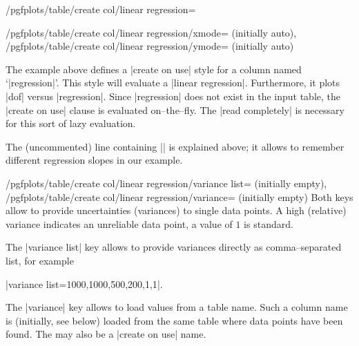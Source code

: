 \begin{stylekey}{/pgfplots/table/create col/linear regression=}
\begin{keylist}{%
		/pgfplots/table/create col/linear regression/xmode= (initially auto),
		/pgfplots/table/create col/linear regression/ymode= (initially auto)}
\begin{codeexample}[]
\end{codeexample}
	The example above defines a |create on use| style for a column named `|regression|'. This style will evaluate a |linear regression|. Furthermore, it plots |dof| versus |regression|. Since |regression| does not exist in the input table, the |create on use| clause is evaluated on--the--fly. The |read completely| is necessary for this sort of lazy evaluation.

	The (uncommented) line containing |\slope| is explained above; it allows to remember different regression slopes in our example.
	\end{keylist}

	\begin{keylist}{%
		/pgfplots/table/create col/linear regression/variance list= (initially empty),%
		/pgfplots/table/create col/linear regression/variance= (initially empty)%
	}
	Both keys allow to provide uncertainties (variances) to single data points. 
	A high (relative) variance indicates an unreliable data point, a value of $1$ is standard.

	The |variance list| key allows to provide variances directly as comma--separated list, for example

	|variance list={1000,1000,500,200,1,1}|.

	The |variance| key allows to load values from a table  name. Such a column name is (initially, see below) loaded from the same table where data points have been found. The  may also be a |create on use| name.
\begin{codeexample}[]
\end{codeexample}


\end{keylist}
\end{stylekey}
